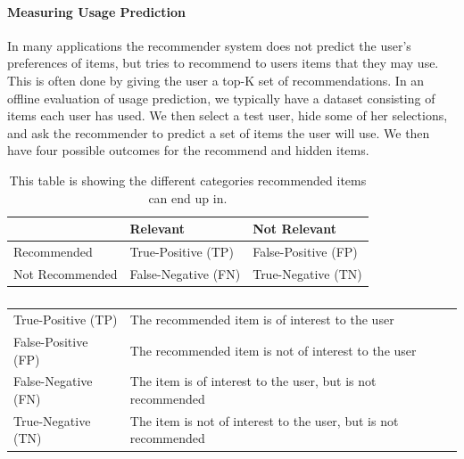 \paragraph{Measuring Usage Prediction}
\label{para:measuring_usage}
In many applications the recommender system does not predict the user's
preferences of items, but tries to recommend to users items that they may use.
This is often done by giving the user a top-K set of recommendations.
In an offline evaluation of usage prediction, we typically have a dataset
consisting of items each user has used. We then select a test user, hide some
of her selections, and ask the recommender to predict a set of items the user
will use. We then have four possible outcomes for the recommend and hidden
items.

\begin{table}[H]
	\centering
	\begin{tabular}{l l l}
	\toprule
					&	Relevant			&	Not Relevant \\ \midrule
	Recommended		&	True-Positive (TP) 	&	False-Positive (FP)	\\
	Not Recommended	&	False-Negative (FN)	&	True-Negative (TN)	\\
	\bottomrule
	\end{tabular}
	\label{table:usageprediction}
	\caption[Usage prediction (Confusion Matrix)]{This table is showing the different categories recommended items can end up in.}
\end{table}

\begin{table}[H]
	\centering
	\begin{tabular}{l l}
		\toprule
		True-Positive (TP)	& The recommended item is of interest to the user \\
		False-Positive (FP)	& The recommended item is not of interest to the user \\
		False-Negative (FN)	& The item is of interest to the user, but is not recommended \\
		True-Negative (TN)	& The item is not of interest to the user, but is not recommended \\
		\bottomrule
	\end{tabular}
	\label{table:predictionCategories}
	\caption[Prediction Categories]{}
\end{table}

